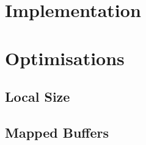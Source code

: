 \section{Implementation}

\section{Optimisations}

\subsection{Local Size}

\subsection{Mapped Buffers}
